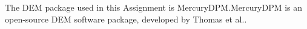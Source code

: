 \documentclass[../BachelorAssignment.tex]{subfiles}
\begin{document}
\graphicspath{{\subfix{../Images/}}}

The DEM package used in this Assignment is MercuryDPM.MercuryDPM is an open-source DEM software package, developed by Thomas et al.\cite{MercuryDPM}. 


\end{document}
